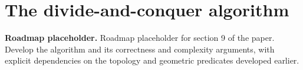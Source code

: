 \chapter{The divide-and-conquer algorithm}

\noindent\textbf{Roadmap placeholder.}
Roadmap placeholder for section 9 of the paper. Develop the algorithm and its
correctness and complexity arguments, with explicit dependencies on the
topology and geometric predicates developed earlier.
